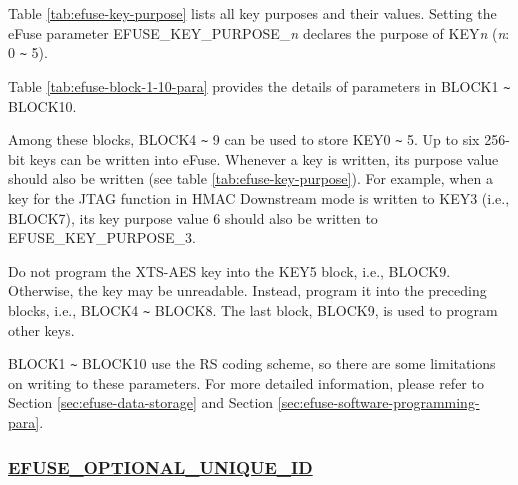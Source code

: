 \documentclass[main\_\_EN.tex]{subfiles}
\begin{document}
\clearpage
\begin{landscape}



\end{landscape}
\restoregeometry
\clearpage


Table \ref{tab:efuse-key-purpose} lists all key purposes and their values. Setting the eFuse parameter EFUSE\_KEY\_PURPOSE\_\textcolor{myred}{\it{n}} declares the purpose of KEY\textcolor{myred}{\it{n}} (\textcolor{myred}{\it{n}}: 0 \verb+~+ 5).



Table  \ref{tab:efuse-block-1-10-para} provides the details of parameters in BLOCK1 \verb+~+ BLOCK10.

\clearpage
\begin{landscape}



\end{landscape}
\restoregeometry
\clearpage



Among these blocks, BLOCK4 \verb+~+ 9 can be used to store KEY0 \verb+~+ 5. Up to six 256-bit keys can be written into eFuse. Whenever a key is written, its purpose value should also be written (see table \ref{tab:efuse-key-purpose}). For example, when a key for the JTAG function in HMAC Downstream mode is written to KEY\textcolor{myred}{3} (i.e., BLOCK7), its key purpose value 6 should also be written to EFUSE\_KEY\_PURPOSE\_\textcolor{myred}{3}.

\begin{tiplisting}
Do not program the XTS-AES key into the KEY5 block, i.e., BLOCK9. Otherwise, the key may be unreadable. Instead, program it into the preceding blocks, i.e., BLOCK4 \verb+~+ BLOCK8. The last block, BLOCK9, is used to program other keys.
\end{tiplisting}

BLOCK1 \verb+~+ BLOCK10 use the RS coding scheme, so there are some limitations on writing to these parameters. For more detailed information, please refer to Section \ref{sec:efuse-data-storage} and Section \ref{sec:efuse-software-programming-para}.

\subsubsection{\texorpdfstring{\hyperref[fielddesc:EFUSEOPTIONALUNIQUEID]{EFUSE\_OPTIONAL\_UNIQUE\_ID}}{EFUSE\_OPTIONAL\_UNIQUE\_ID}}
\label{sec:efuse-optional-unique-id}
\end{document}
